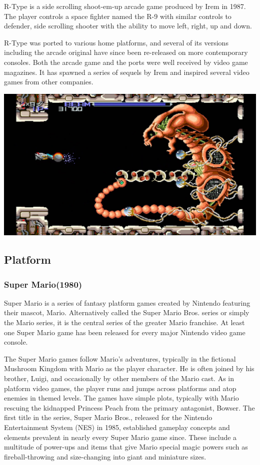 \documentclass{article}
\begin{document}
R-Type is a side scrolling shoot-em-up arcade game produced by Irem in 1987. The player controls a space fighter named the R-9 with similar controls to defender, side scrolling shooter with the ability to move left, right, up and down.

R-Type was ported to various home platforms, and several of its versions including the arcade original have since been re-released on more contemporary consoles. Both the arcade game and the ports were well received by video game magazines. It has spawned a series of sequels by Irem and inspired several video games from other companies.

\includegraphics [scale=0.3]{rtype}
\clearpage		
			
\subsection{Platform}
\subsubsection{Super Mario(1980)}

Super Mario is a series of fantasy platform games created by Nintendo featuring their mascot, Mario. Alternatively called the Super Mario Bros. series or simply the Mario series, it is the central series of the greater Mario franchise. At least one Super Mario game has been released for every major Nintendo video game console.

The Super Mario games follow Mario's adventures, typically in the fictional Mushroom Kingdom with Mario as the player character. He is often joined by his brother, Luigi, and occasionally by other members of the Mario cast. As in platform video games, the player runs and jumps across platforms and atop enemies in themed levels. The games have simple plots, typically with Mario rescuing the kidnapped Princess Peach from the primary antagonist, Bowser. The first title in the series, Super Mario Bros., released for the Nintendo Entertainment System (NES) in 1985, established gameplay concepts and elements prevalent in nearly every Super Mario game since. These include a multitude of power-ups and items that give Mario special magic powers such as fireball-throwing and size-changing into giant and miniature sizes.
\end{document}
